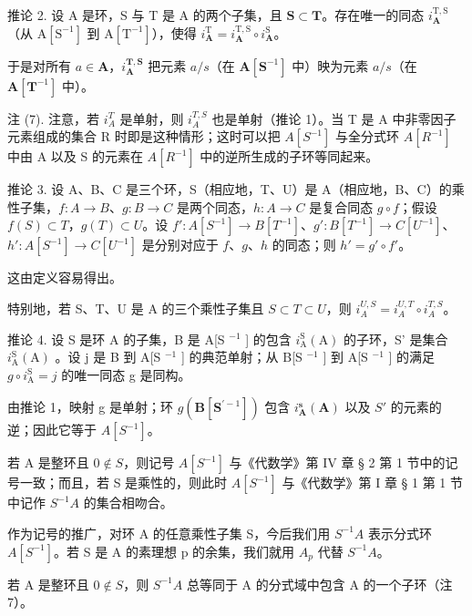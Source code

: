 推论 2. 设 A 是环，S 与 T 是 A 的两个子集，且 \(\mathbf{S} \subset \mathbf{T}\)。存在唯一的同态 \(i_{\mathbf{A}}^{\mathrm{T},\mathrm{S}}\)（从 \(\mathrm{A}[\mathrm{S}^{-1}]\) 到 \(\mathrm{A}[\mathrm{T}^{-1}]\)），使得 \(i_{\mathbf{A}}^{\mathrm{T}} = i_{\mathbf{A}}^{\mathrm{T},\mathrm{S}} \circ i_{\mathbf{A}}^{\mathrm{S}}\)。

于是对所有 \(a \in \mathbf{A}\)，\(i_{\mathbf{A}}^{\mathbf{T},\mathbf{S}}\) 把元素 \(a / s\)（在 \(\mathbf{A}[\mathbf{S}^{-1}]\) 中）映为元素 \(a / s\)（在 \(\mathbf{A}[\mathbf{T}^{-1}]\) 中）。

注 (7). 注意，若 \(i_{A}^{T}\) 是单射，则 \(i_{A}^{T,S}\) 也是单射（推论 1）。当 T 是 A 中非零因子元素组成的集合 R 时即是这种情形；这时可以把 \(A[S^{-1}]\) 与全分式环 \(A[R^{-1}]\) 中由 A 以及 S 的元素在 \(A[R^{-1}]\) 中的逆所生成的子环等同起来。

推论 3. 设 A、B、C 是三个环，S（相应地，T、U）是 A（相应地，B、C）的乘性子集，\(f\colon A \to B\)、\(g\colon B \to C\) 是两个同态，\(h\colon A \to C\) 是复合同态 \(g \circ f\)；假设 \(f(S) \subset T\)，\(g(T) \subset U\)。设 \(f'\colon A[S^{-1}] \to B[T^{-1}]\)、\(g'\colon B[T^{-1}] \to C[U^{-1}]\)、\(h'\colon A[S^{-1}] \to C[U^{-1}]\) 是分别对应于 \(f\)、\(g\)、\(h\) 的同态；则 \(h' = g' \circ f'\)。

这由定义容易得出。

特别地，若 S、T、U 是 A 的三个乘性子集且 \(S \subset T \subset U\)，则 \(i_{A}^{U,S} = i_{A}^{U,T} \circ i_{A}^{T,S}\)。

推论 4. 设 S 是环 A 的子集，B 是 A{[}S \(^{-1}\) {]} 的包含 \(i_{\text{A}}^{\text{S}}(\text{A})\) 的子环，S' 是集合 \(i_{\text{A}}^{\text{S}}(\text{A})\) 。设 j 是 B 到 A{[}S \(^{-1}\) {]} 的典范单射；从 B{[}S \(^{-1}\) {]} 到 A{[}S \(^{-1}\) {]} 的满足 \(g \circ i_{\text{A}}^{\text{S}} = j\) 的唯一同态 g 是同构。

由推论 1，映射 g 是单射；环 \(g(\mathbf{B}[\mathbf{S}^{\prime-1}])\) 包含 \(i_{\mathbf{A}}^{\mathbf{s}}(\mathbf{A})\) 以及 \(S'\) 的元素的逆；因此它等于 \(A[S^{-1}]\)。

若 A 是整环且 \(0 \notin S\)，则记号 \(A[S^{-1}]\) 与《代数学》第 IV 章 § 2 第 1 节中的记号一致；而且，若 S 是乘性的，则此时 \(A[S^{-1}]\) 与《代数学》第 I 章 § 1 第 1 节中记作 \(S^{-1}A\) 的集合相吻合。

作为记号的推广，对环 A 的任意乘性子集 S，今后我们用 \(S^{-1}A\) 表示分式环 \(A[S^{-1}]\)。若 S 是 A 的素理想 p 的余集，我们就用 \(A_{p}\) 代替 \(S^{-1}A\)。

若 A 是整环且 \(0 \notin S\)，则 \(S^{-1}A\) 总等同于 A 的分式域中包含 A 的一个子环（注 7）。

